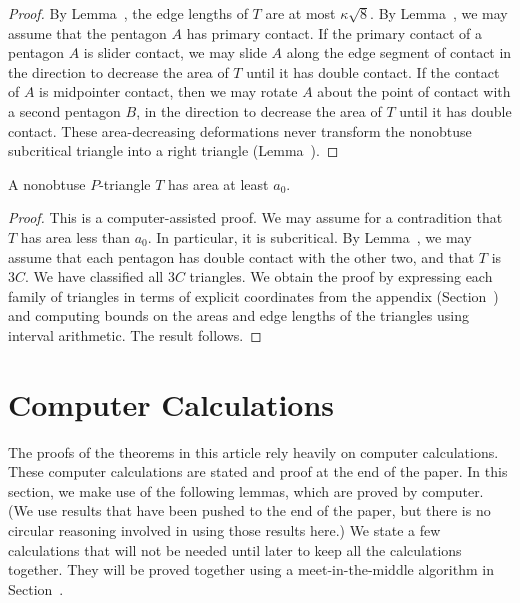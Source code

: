 \begin{proof}
  By Lemma~, the edge lengths of $T$ are at most
  $\kappa\sqrt8$.  By Lemma~, we may assume
  that the pentagon $A$ has primary contact.  If the primary contact
  of a pentagon $A$ is slider contact, we may slide $A$ along the edge segment
  of contact in the direction to decrease the area of $T$ until it has
  double contact.  If the contact of $A$ is midpointer contact, then
  we may rotate $A$ about the point of contact with a second pentagon
  $B$, in the direction to decrease the area of $T$ until it has
  double contact.  These area-decreasing deformations never transform
  the nonobtuse subcritical triangle into a right triangle
  (Lemma~).
\end{proof}


\begin{lemma}  
A nonobtuse $P$-triangle $T$ has area at least $a_0$.
\end{lemma}

\begin{proof} This is a computer-assisted proof.  We may assume for a
  contradition that $T$ has area less than $a_0$.  In particular, it
  is subcritical.  By Lemma~, we may assume that each
  pentagon has double contact with the other two, and that $T$ is
  $3C$.  We have classified all $3C$ triangles.  We obtain the proof
by expressing each family of triangles in terms of explicit
coordinates from the appendix (Section~) and
computing bounds on the areas and edge lengths of the triangles using
interval arithmetic.  The result follows.
\end{proof}

\section{Computer Calculations}

The proofs of the theorems in this article rely heavily on computer calculations.
These computer calculations are stated and proof at the end of the paper.
In this section, we make use of the following lemmas, which are proved by
computer.  (We use results that have been pushed to the end of the paper, but
there is no circular reasoning involved in using those results here.)  We state
a few calculations that will not be needed until later to keep all  the calculations
together.  They will be proved together using a meet-in-the-middle algorithm in
Section~.

